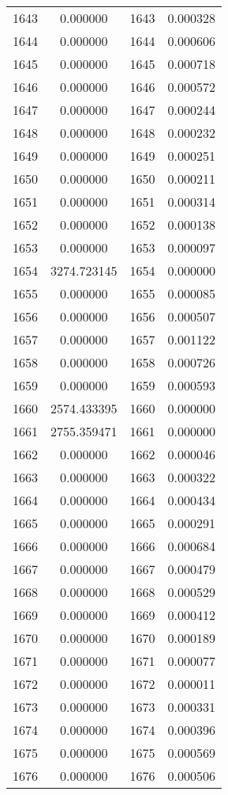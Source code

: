 \documentclass[12pt]{article}
\begin{document}
\begin{longtable}{@{}cccc@{}}
1643 & 0.000000 & 1643 & 0.000328 \\
1644 & 0.000000 & 1644 & 0.000606 \\
1645 & 0.000000 & 1645 & 0.000718 \\
1646 & 0.000000 & 1646 & 0.000572 \\
1647 & 0.000000 & 1647 & 0.000244 \\
1648 & 0.000000 & 1648 & 0.000232 \\
1649 & 0.000000 & 1649 & 0.000251 \\
1650 & 0.000000 & 1650 & 0.000211 \\
1651 & 0.000000 & 1651 & 0.000314 \\
1652 & 0.000000 & 1652 & 0.000138 \\
1653 & 0.000000 & 1653 & 0.000097 \\
1654 & 3274.723145 & 1654 & 0.000000 \\
1655 & 0.000000 & 1655 & 0.000085 \\
1656 & 0.000000 & 1656 & 0.000507 \\
1657 & 0.000000 & 1657 & 0.001122 \\
1658 & 0.000000 & 1658 & 0.000726 \\
1659 & 0.000000 & 1659 & 0.000593 \\
1660 & 2574.433395 & 1660 & 0.000000 \\
1661 & 2755.359471 & 1661 & 0.000000 \\
1662 & 0.000000 & 1662 & 0.000046 \\
1663 & 0.000000 & 1663 & 0.000322 \\
1664 & 0.000000 & 1664 & 0.000434 \\
1665 & 0.000000 & 1665 & 0.000291 \\
1666 & 0.000000 & 1666 & 0.000684 \\
1667 & 0.000000 & 1667 & 0.000479 \\
1668 & 0.000000 & 1668 & 0.000529 \\
1669 & 0.000000 & 1669 & 0.000412 \\
1670 & 0.000000 & 1670 & 0.000189 \\
1671 & 0.000000 & 1671 & 0.000077 \\
1672 & 0.000000 & 1672 & 0.000011 \\
1673 & 0.000000 & 1673 & 0.000331 \\
1674 & 0.000000 & 1674 & 0.000396 \\
1675 & 0.000000 & 1675 & 0.000569 \\
1676 & 0.000000 & 1676 & 0.000506 \\

\end{longtable}
\end{document}
